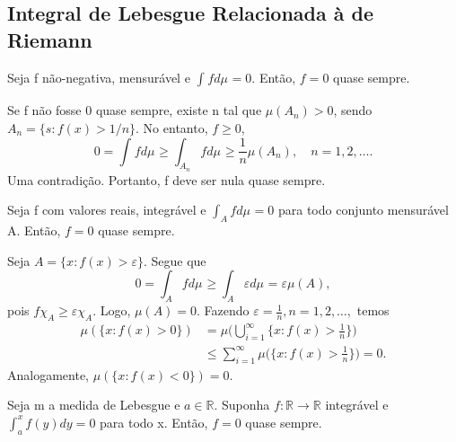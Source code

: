 \documentclass[measure_theory.tex]{subfiles}
\begin{document}
\subsection{Integral de Lebesgue Relacionada à de Riemann}
\begin{prop*}
	Seja f não-negativa, mensurável e \(\int_{}f d\mu_{} = 0.\) Então, \(f=0\) quase sempre.
\end{prop*}
\begin{proof*}
	Se f não fosse 0 quase sempre, existe n tal que \(\mu (A_{n}) > 0\), sendo \(A_{n} = \{s: f(x) > 1/n\}\). No entanto, \(f\geq 0\),
	\[
		0 = \int_{}f d\mu_{} \geq \int_{A_{n}}f d\mu_{} \geq \frac{1}{n}\mu (A_{n}),\quad n = 1, 2, \dotsc .
	\]
	Uma contradição. Portanto, f deve ser nula quase sempre. \qedsymbol
\end{proof*}
\begin{prop*}
	Seja f com valores reais, integrável  e \(\int_{A}f d\mu_{} = 0\) para todo conjunto mensurável A. Então, \(f=0\) quase sempre.
\end{prop*}
\begin{proof*}
	Seja \(A = \{x: f(x) > \varepsilon \}.\) Segue que
	\[
		0 = \int_{A}f d\mu_{} \geq \int_{A}\varepsilon  d\mu_{} = \varepsilon \mu (A),
	\]
	pois \(f \chi_{A} \geq \varepsilon \chi_{A}\). Logo, \(\mu (A) = 0\). Fazendo \(\varepsilon  = \frac{1}{n}, n = 1, 2, \dotsc ,\) temos
	\begin{align*}
		\mu (\{x:f(x) > 0\}) & = \mu \biggl(\bigcup_{i=1}^{\infty}\biggl\{x: f(x) > \frac{1}{n}\biggr\}\biggr)          \\
		                     & \leq \sum\limits_{i=1}^{\infty}\mu \biggl(\biggl\{x:f(x)>\frac{1}{n}\biggr\}\biggr) = 0.
	\end{align*}
	Analogamente, \(\mu (\{x:f(x)<0\}) = 0.\) \qedsymbol
\end{proof*}
\begin{crl*}
	Seja m a medida de Lebesgue e \(a\in \mathbb{R}\). Suponha \(f:\mathbb{R}\rightarrow \mathbb{R}\) integrável e \(\int_{a}^{x}f(y)dy = 0\) para todo x. Então, \(f=0\) quase sempre.
\end{crl*}
\end{document}
